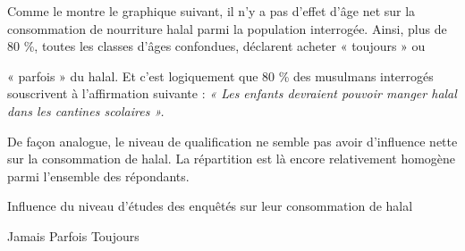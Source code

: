 Comme le montre le graphique suivant, il n'y a pas d'effet d'âge net sur
la consommation de nourriture halal parmi la population interrogée.
Ainsi, plus de 80 \%, toutes les classes d'âges confondues, déclarent
acheter « toujours » ou

« parfois » du halal. Et c'est logiquement que 80 \% des musulmans
interrogés souscrivent à l'affirmation suivante : \emph{« Les enfants
devraient pouvoir manger halal dans les cantines scolaires ».}

De façon analogue, le niveau de qualification ne semble pas avoir
d'influence nette sur la consommation de halal. La répartition est là
encore relativement homogène parmi l'ensemble des répondants.


Influence du niveau d'études des enquêtés sur leur consommation de halal


Jamais Parfois Toujours


